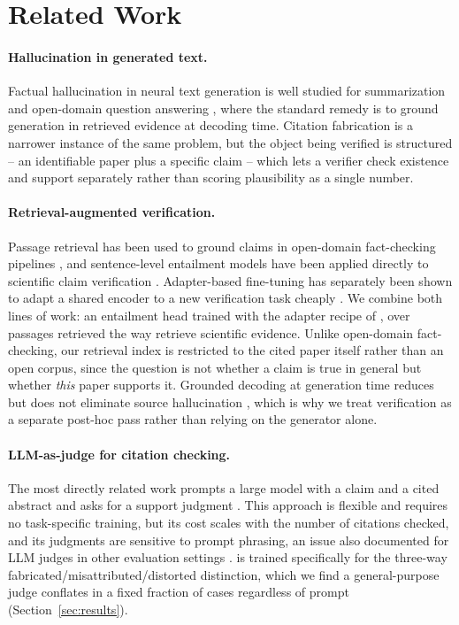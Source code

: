 \section{Related Work}

\paragraph{Hallucination in generated text.} Factual hallucination in
neural text generation is well studied for summarization and open-domain
question answering \citep{tanaka2020span, ferreira2019attention}, where the
standard remedy is to ground generation in retrieved evidence at decoding
time. Citation fabrication is a narrower instance of the same problem, but
the object being verified is structured -- an identifiable paper plus a
specific claim -- which lets a verifier check existence and support
separately rather than scoring plausibility as a single number.

\paragraph{Retrieval-augmented verification.} Passage retrieval has been
used to ground claims in open-domain fact-checking pipelines
\citep{delgado2021retrieval}, and sentence-level entailment models have
been applied directly to scientific claim verification
\citep{holm2022entailment}. Adapter-based fine-tuning has separately been
shown to adapt a shared encoder to a new verification task cheaply
\citep{schneider2020adapter}. We combine both lines of work: an entailment
head trained with the adapter recipe of \citet{schneider2020adapter}, over
passages retrieved the way \citet{holm2022entailment} retrieve scientific
evidence. Unlike open-domain fact-checking, our retrieval index is
restricted to the cited paper itself rather than an open corpus, since the
question is not whether a claim is true in general but whether
\emph{this} paper supports it. Grounded decoding at generation time reduces
but does not eliminate source hallucination \citep{voss2023hallucination},
which is why we treat verification as a separate post-hoc pass rather than
relying on the generator alone.

\paragraph{LLM-as-judge for citation checking.} The most directly related
work prompts a large model with a claim and a cited abstract and asks for a
support judgment \citep{nakamura2021survey}. This approach is flexible and
requires no task-specific training, but its cost scales with the number of
citations checked, and its judgments are sensitive to prompt phrasing, an
issue also documented for LLM judges in other evaluation settings
\citep{oyelaran2022lowresource}.  is trained specifically
for the three-way fabricated/misattributed/distorted distinction, which we
find a general-purpose judge conflates in a fixed fraction of cases
regardless of prompt (Section~\ref{sec:results}).

